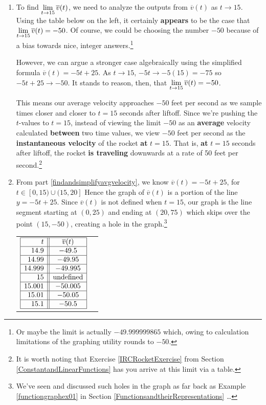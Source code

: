 \documentclass{ximera}
\begin{document}
\begin{ex}
\begin{enumerate}
\item  To find $\ds{ \lim_{t \rightarrow 15} \overline{v}(t)}$, we need to analyze the outputs from $\overline{v}(t)$ as $t \rightarrow 15$. Using the table below on the left, it certainly \textbf{appears} to be the case that $\ds{ \lim_{t \rightarrow 15} \overline{v}(t) = -50}$.  Of course, we could be choosing the number $-50$ because of a bias towards nice, integer answers.\footnote{Or maybe the limit is actually $-49.999999865$ which, owing to calculation limitations of the graphing utility rounds to $-50$.}

However, we can argue a stronger case algebraically using the simplified formula  $\overline{v}(t) = -5t+25$.   As $t \rightarrow15$,  $-5t \rightarrow -5(15) = -75$ so $-5t+25 \rightarrow -50$.  It stands to reason, then, that $\ds{ \lim_{t \rightarrow 15} \overline{v}(t) = -50}$.

This means our average velocity approaches $-50$ feet per second as we sample times closer and closer to $t = 15$ seconds after liftoff.  Since we're pushing the $t$-values to $t=15$, instead of viewing the limit $-50$ as an  \textbf{average} velocity calculated \textbf{between} two time values,  we view $-50$ feet per second as the  \textbf{instantaneous velocity} of the rocket \textbf{at} $t = 15$.   That is, \textbf{at} $t = 15$ seconds after liftoff, the rocket \textbf{is traveling} downwards at a rate of 50 feet per second.\footnote{It is worth noting that  Exercise \ref{IRCRocketExercise} from Section \ref{ConstantandLinearFunctions} has you arrive at this limit via a table.} 

\item    From part \ref{findandsimplifyavgvelocity}, we know $\overline{v}(t) = -5t+25$,  for $t \in [0, 15) \cup (15, 20]$  Hence the graph of  $\overline{v}(t)$ is a portion of the line $y=  -5t+25$.  Since $\overline{v}(t)$ is not defined when $t = 15$, our graph is the line segment starting at $(0, 25)$ and ending at $(20, 75)$ which skips over the point $(15, -50)$, creating a hole in the graph.\footnote{We've seen and discussed such holes in the graph as far back as Example \ref{functiongraphex01} in Section \ref{FunctionsandtheirRepresentations}  \ldots}   
\begin{center}

\begin{tabular}{m{2.5in}m{2.5in}}

$\begin{array}{|r||c|}  \hline
  t & \overline{v}(t)  \\ \hline
 14.9 & -49.5  \\  \hline
14.99 & -49.95  \\  \hline 
14.999 & -49.995  \\  \hline 
15 & \text{undefined} \\  \hline 
15.001 & -50.005 \\  \hline
15.01 & -50.05 \\  \hline  
15.1 & -50.5 \\  \hline 
  \end{array} $ 
  

\end{tabular}
\end{center}
\end{enumerate}
\end{ex}
\end{document}
